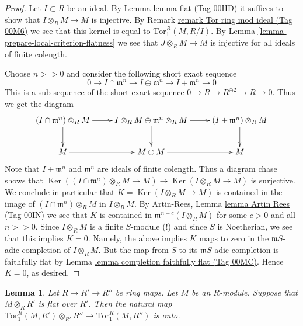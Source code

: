 \documentclass{amsart}
\theoremstyle{plain}
\newtheorem{lemma}[subsection]{Lemma}
\theoremstyle{definition}
\theoremstyle{remark}
\numberwithin{equation}{subsection}
\def\Ker{\mathop{\mathrm{Ker}}}
\begin{document}
\begin{proof}
Let $I \subset R$ be an ideal. By Lemma \href{https://stacks.math.columbia.edu/tag/00HD}{lemma flat (Tag 00HD)} it suffices
to show that $I \otimes_R M \to M$ is injective. By Remark
\href{https://stacks.math.columbia.edu/tag/00M6}{remark Tor ring mod ideal (Tag 00M6)} we see that this kernel is
equal to $\text{Tor}_1^R(M, R/I)$. By
Lemma \ref{lemma-prepare-local-criterion-flatness}
we see that $J \otimes_R M \to M$ is injective for all ideals
of finite colength.

\medskip\noindent
Choose $n >> 0$ and consider the following short exact
sequence
$$
0
\to I \cap \mathfrak m^n
\to I \oplus \mathfrak m^n
\to I + \mathfrak m^n
\to 0
$$
This is a sub sequence of the short exact sequence
$0 \to R \to R^{\oplus 2} \to R \to 0$. Thus we get the diagram
$$
\xymatrix{
(I\cap \mathfrak m^n) \otimes_R M \ar[r] \ar[d] &
I \otimes_R M \oplus \mathfrak m^n \otimes_R M \ar[r] \ar[d] &
(I + \mathfrak m^n) \otimes_R M \ar[d] \\
M \ar[r] &
M \oplus M \ar[r] &
M
}
$$
Note that $I + \mathfrak m^n$ and $\mathfrak m^n$
are ideals of finite colength.
Thus a diagram chase shows that
$\Ker((I \cap \mathfrak m^n)\otimes_R M \to M)
\to \Ker(I \otimes_R M \to M)$
is surjective. We conclude in particular that
$K = \Ker(I \otimes_R M \to M)$ is contained
in the image of $(I \cap \mathfrak m^n) \otimes_R M$
in $I \otimes_R M$. By Artin-Rees, Lemma \href{https://stacks.math.columbia.edu/tag/00IN}{lemma Artin Rees (Tag 00IN)}
we see that $K$ is contained
in $\mathfrak m^{n-c}(I \otimes_R M)$ for some $c > 0$
and all $n >> 0$. Since $I \otimes_R M$ is a finite
$S$-module (!) and since $S$ is Noetherian, we see
that this implies $K = 0$. Namely, the above implies
$K$ maps to zero in the $\mathfrak mS$-adic completion
of $I \otimes_R M$. But the map from $S$
to its $\mathfrak mS$-adic completion is faithfully flat
by Lemma \href{https://stacks.math.columbia.edu/tag/00MC}{lemma completion faithfully flat (Tag 00MC)}.
Hence $K = 0$, as desired.
\end{proof}


\begin{lemma}
\label{lemma-surjective-on-tor-one}
Let $R \to R' \to R''$ be ring maps.
Let $M$ be an $R$-module. Suppose that $M \otimes_R R'$
is flat over $R'$. Then the natural map
$\text{Tor}_1^R(M, R') \otimes_{R'} R'' \to
\text{Tor}_1^R(M, R'')$ is onto.
\end{lemma}
\end{document}
